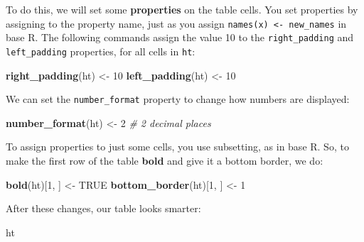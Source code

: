 \documentclass[]{article}
\newenvironment{Shaded}{\begin{snugshade}}{\end{snugshade}}
\newcommand{\CommentTok}[1]{\textcolor[rgb]{0.56,0.35,0.01}{\textit{#1}}}
\newcommand{\DecValTok}[1]{\textcolor[rgb]{0.00,0.00,0.81}{#1}}
\newcommand{\KeywordTok}[1]{\textcolor[rgb]{0.13,0.29,0.53}{\textbf{#1}}}
\newcommand{\NormalTok}[1]{#1}
\newcommand{\OtherTok}[1]{\textcolor[rgb]{0.56,0.35,0.01}{#1}}
\newcommand{\StringTok}[1]{\textcolor[rgb]{0.31,0.60,0.02}{#1}}
\begin{document}
To do this, we will set some \textbf{properties} on the table cells. You
set properties by assigning to the property name, just as you assign
\texttt{names(x)\ \textless{}-\ new\_names} in base R. The following
commands assign the value 10 to the \texttt{right\_padding} and
\texttt{left\_padding} properties, for all cells in \texttt{ht}:

\begin{Shaded}
\begin{Highlighting}[]
\KeywordTok{right_padding}\NormalTok{(ht) <-}\StringTok{ }\DecValTok{10}
\KeywordTok{left_padding}\NormalTok{(ht)  <-}\StringTok{ }\DecValTok{10}
\end{Highlighting}
\end{Shaded}

\FloatBarrier

We can set the \texttt{number\_format} property to change how numbers
are displayed:

\begin{Shaded}
\begin{Highlighting}[]
\KeywordTok{number_format}\NormalTok{(ht) <-}\StringTok{ }\DecValTok{2}    \CommentTok{# 2 decimal places}
\end{Highlighting}
\end{Shaded}

\FloatBarrier

To assign properties to just some cells, you use subsetting, as in base
R. So, to make the first row of the table \textbf{bold} and give it a
bottom border, we do:

\begin{Shaded}
\begin{Highlighting}[]
\KeywordTok{bold}\NormalTok{(ht)[}\DecValTok{1}\NormalTok{, ]          <-}\StringTok{ }\OtherTok{TRUE}
\KeywordTok{bottom_border}\NormalTok{(ht)[}\DecValTok{1}\NormalTok{, ] <-}\StringTok{ }\DecValTok{1}
\end{Highlighting}
\end{Shaded}

\FloatBarrier

After these changes, our table looks smarter:

\begin{Shaded}
\begin{Highlighting}[]
\NormalTok{ht}
\end{Highlighting}
\end{Shaded}

 
  \providecommand{\huxb}[2]{\arrayrulecolor[RGB]{#1}\global\arrayrulewidth=#2pt}
  \providecommand{\huxvb}[2]{\color[RGB]{#1}\vrule width #2pt}
  \providecommand{\huxtpad}[1]{\rule{0pt}{\baselineskip+#1}}
  \providecommand{\huxbpad}[1]{\rule[-#1]{0pt}{#1}}
\end{document}
